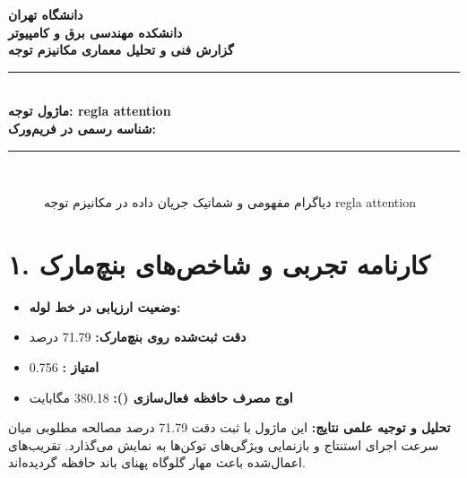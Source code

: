 \documentclass[12pt,a4paper]{article}
\begin{document}
\begin{center}
{\Large\bfseries دانشگاه تهران}\\[0.2cm]
{\large\bfseries دانشکده مهندسی برق و کامپیوتر}\\[0.2cm]
{\large\bfseries گزارش فنی و تحلیل معماری مکانیزم توجه}\\[0.5cm]
\rule{\linewidth}{1pt}\\[0.3cm]
{\LARGE\bfseries ماژول توجه: regla attention}\\[0.2cm]
{\large \textbf{شناسه رسمی در فریم‌ورک:} }\\[0.2cm]
\rule{\linewidth}{1pt}\\[0.5cm]
\end{center}

\begin{figure}[H]
\centering
{}
\caption{دیاگرام مفهومی و شماتیک جریان داده در مکانیزم توجه regla attention}
\end{figure}

\section*{۱. کارنامه تجربی و شاخص‌های بنچ‌مارک}
\begin{itemize}
\item \textbf{وضعیت ارزیابی در خط لوله:} 
\item \textbf{دقت ثبت‌شده روی بنچ‌مارک:} 71.79 درصد
\item \textbf{امتیاز :} 0.756
\item \textbf{اوج مصرف حافظه فعال‌سازی ():} 380.18 مگابایت
\end{itemize}
\textbf{تحلیل و توجیه علمی نتایج:} این ماژول با ثبت دقت 71.79 درصد مصالحه مطلوبی میان سرعت اجرای استنتاج و بازنمایی ویژگی‌های توکن‌ها به نمایش می‌گذارد. تقریب‌های اعمال‌شده باعث مهار گلوگاه پهنای باند حافظه گردیده‌اند.
\end{document}
